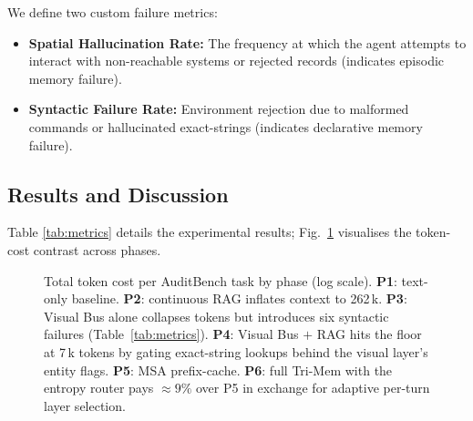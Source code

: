 \documentclass[conference]{IEEEtran}
\begin{document}
We define two custom failure metrics:
\begin{itemize}
    \item \textbf{Spatial Hallucination Rate:} The frequency at which the agent attempts to interact with non-reachable systems or rejected records (indicates episodic memory failure).
    \item \textbf{Syntactic Failure Rate:} Environment rejection due to malformed commands or hallucinated exact-strings (indicates declarative memory failure).
\end{itemize}

\subsection{Results and Discussion}
Table \ref{tab:metrics} details the experimental results; Fig.~\ref{fig:auditbench-tokens} visualises the token-cost contrast across phases.

\begin{figure}[t]
    \centering
    \caption{Total token cost per AuditBench task by phase (log scale). \textbf{P1}: text-only baseline. \textbf{P2}: continuous RAG inflates context to 262\,k. \textbf{P3}: Visual Bus alone collapses tokens but introduces six syntactic failures (Table~\ref{tab:metrics}). \textbf{P4}: Visual Bus $+$ RAG hits the floor at 7\,k tokens by gating exact-string lookups behind the visual layer's entity flags. \textbf{P5}: MSA prefix-cache. \textbf{P6}: full Tri-Mem with the entropy router pays $\approx 9\%$ over P5 in exchange for adaptive per-turn layer selection.}
    \label{fig:auditbench-tokens}
\end{figure}
\end{document}
